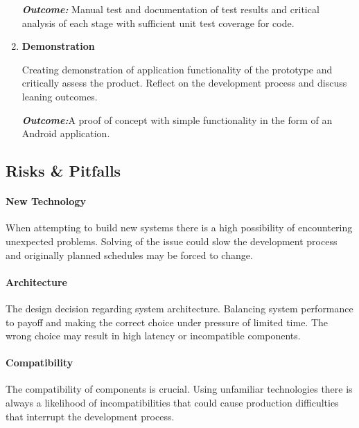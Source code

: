 \documentclass[a4paper, 11pt]{article}
\begin{document}
\begin{enumerate}
\begin{flushleft}
	\emph{\textbf{Outcome:}} Manual test and documentation of test results and critical analysis of each stage with sufficient unit test coverage for code.
	\vspace{\baselineskip}
  	\end{flushleft}
	   \item \textbf{Demonstration}
   	\begin{flushleft}Creating demonstration of application functionality of the prototype and critically assess the product. Reflect on the development process and discuss leaning outcomes. 
	
	\emph{\textbf{Outcome:}}A proof of concept with simple functionality in the form of an Android application.
	  	\end{flushleft}
\end{enumerate}
\vspace{\baselineskip}


\vspace{\baselineskip}
\vspace{\baselineskip}
\vspace{\baselineskip}

\subsection{Risks \& Pitfalls}
\paragraph{New Technology}When attempting to build new systems there is a high possibility of encountering unexpected problems. Solving of the issue could slow the development process and originally planned schedules may be forced to change. 

\paragraph{Architecture}The design decision regarding system architecture. Balancing system performance to payoff and making the correct choice under pressure of limited time. The wrong choice may result in high latency or incompatible components.   

\paragraph{Compatibility}The compatibility of components is crucial. Using unfamiliar technologies there is always a likelihood of incompatibilities that could cause production difficulties that interrupt the development process. 
\end{document}
